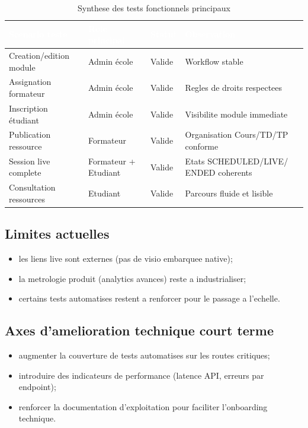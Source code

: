 \documentclass[12pt,a4paper,oneside]{report}
\begin{document}
\renewcommand{\arraystretch}{1.3}
\begin{table}[H]
\centering
\caption{Synthese des tests fonctionnels principaux}
\label{tab:tests_ch3}
\begin{tabular}{|p{4.3cm}|p{3.2cm}|p{2.4cm}|p{2.6cm}|}
\hline
\rowcolor{ustoblue}
\textcolor{white}{Scenario teste} &
\textcolor{white}{Role principal} &
\textcolor{white}{Statut} &
\textcolor{white}{Observation} \\
\hline
Creation/edition module & Admin école & Valide & Workflow stable \\
\hline
Assignation formateur & Admin école & Valide & Regles de droits respectees \\
\hline
Inscription étudiant & Admin école & Valide & Visibilite module immediate \\
\hline
Publication ressource & Formateur & Valide & Organisation Cours/TD/TP conforme \\
\hline
Session live complete & Formateur + Etudiant & Valide & Etats SCHEDULED/LIVE/ ENDED coherents \\
\hline
Consultation ressources & Etudiant & Valide & Parcours fluide et lisible \\
\hline
\end{tabular}
\end{table}

\subsection{Limites actuelles}

\begin{itemize}
  \item les liens live sont externes (pas de visio embarquee native);
  \item la metrologie produit (analytics avances) reste a industrialiser;
  \item certains tests automatises restent a renforcer pour le passage a l'echelle.
\end{itemize}

\subsection{Axes d'amelioration technique court terme}

\begin{itemize}
  \item augmenter la couverture de tests automatises sur les routes critiques;
  \item introduire des indicateurs de performance (latence API, erreurs par endpoint);
  \item renforcer la documentation d'exploitation pour faciliter l'onboarding technique.
\end{itemize}
\end{document}
